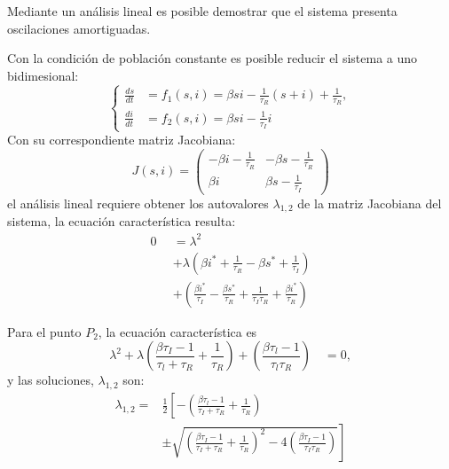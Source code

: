 \documentclass[twocolumn,aps,prl]{revtex4-1}
\newcommand*\sepline{%
  \begin{center}
    \rule[1ex]{.5\textwidth}{.5pt}
  \end{center}}
\begin{document}
Mediante un análisis lineal es posible demostrar que el sistema presenta oscilaciones amortiguadas. 

Con la condición de población constante es posible reducir el sistema a uno bidimesional:
$$ \left\lbrace
\begin{aligned}
\frac{d s}{d t} &= f_1(s, i) = \beta s i - \frac{1}{\tau_{R}} (s+i) +  \frac{1}{\tau_{R}}   , \\
\frac{d i}{d t} &= f_2(s, i) = \beta s i-\frac{1}{\tau_{I}} i  
\end{aligned}
\right.
$$
Con su correspondiente matriz Jacobiana:
$$
J (s, i) = 
\left(
  \begin{array}{cc}
-\beta i - \frac{1}{\tau_{R}} & -\beta s - \frac{1}{\tau_{R}} \\
 \beta i                     &   \beta s - \frac{1}{\tau_{I}}
  \end{array}
\right)
$$
el análisis lineal requiere obtener los autovalores $\lambda_{1,2}$ de la matriz Jacobiana del sistema, la ecuación característica resulta:
$$
\begin{aligned}
  0 & = \lambda^{2} \\
  \quad & +\lambda\left(\beta i^{*}+\frac{1}{\tau_{R}}-\beta s^{*}+\frac{1}{\tau_{I}}\right) \\
  \quad & +\left(\frac{\beta i^{*}}{\tau_{I}}-\frac{\beta s^{*}}{\tau_{R}}+\frac{1}{\tau_{I} \tau_{R}}+\frac{\beta i^{*}}{\tau_{R}}\right)
\end{aligned}
$$

Para el punto $P_2$, la ecuación característica es
$$
\lambda^{2}+\lambda\left(\frac{\beta \tau_{I}-1}{\tau_{l}+\tau_{R}}+\frac{1}{\tau_{R}}\right)+\left(\frac{\beta \tau_{l}-1}{\tau_{l} \tau_{R}}\right) \quad=0, 
$$
y las soluciones, $\lambda_{1, 2}$ son:
$$
\begin{aligned}
  \lambda_{1,2} =
  & \frac{1}{2} \left[-
  \left(\frac{\beta \tau_{l}-1}{\tau_{I}+\tau_{R}}+\frac{1}{\tau_{R}}\right)  \right.\\
  &
  \left.
  \pm \sqrt{\left(\frac{\beta \tau_{I}-1}{\tau_{I}+\tau_{R}}+\frac{1}{\tau_{R}}\right)^{2}-4\left(\frac{\beta \tau_{I}-1}{\tau_{I} \tau_{R}}\right)} \right]
\end{aligned}
$$
\end{document}
